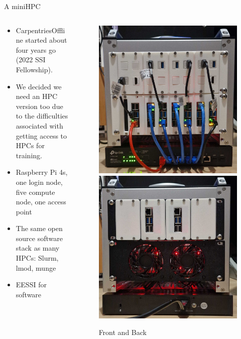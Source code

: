 \begin{frame}{A miniHPC}
	\begin{columns}[T]
		\begin{column}[c]{.6\textwidth}
			\begin{itemize}
				\item CarpentriesOffline started about four years go (2022 SSI Fellowship).
				\item We decided we need an HPC version too due to the difficulties associated with getting access to HPCs for training.
				\item Raspberry Pi 4s, one login node, five compute node, one access point
				\item The same open source software stack as many HPCs: Slurm, lmod, munge
				\item EESSI for software
				
			\end{itemize}
		\end{column}
		
		\begin{column}[c]{.5\textwidth}
			\begin{figure}
				\includegraphics[width=.4\columnwidth]{images/mini-HPC-proto3.png} 
				\includegraphics[width=.4\columnwidth]{images/mini-HPC-proto3_back.png}
				\caption*{Front and Back}
			\end{figure}
		\end{column}
	\end{columns}
	
\end{frame}